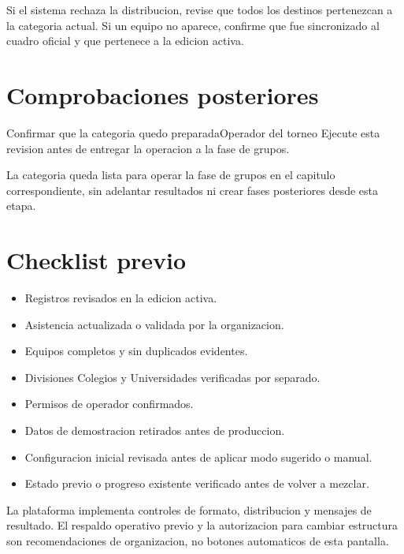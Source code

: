 \begin{fallas}
Si el sistema rechaza la distribucion, revise que todos los destinos pertenezcan a la categoria actual. Si un equipo no aparece, confirme que fue sincronizado al cuadro oficial y que pertenece a la edicion activa.
\end{fallas}

\section{Comprobaciones posteriores}

\begin{procedimiento}{Confirmar que la categoria quedo preparada}{Operador del torneo}
Ejecute esta revision antes de entregar la operacion a la fase de grupos.
\end{procedimiento}


\begin{resultadoesperado}
La categoria queda lista para operar la fase de grupos en el capitulo correspondiente, sin adelantar resultados ni crear fases posteriores desde esta etapa.
\end{resultadoesperado}

\section{Checklist previo}

\begin{itemize}
    \item Registros revisados en la edicion activa.
    \item Asistencia actualizada o validada por la organizacion.
    \item Equipos completos y sin duplicados evidentes.
    \item Divisiones Colegios y Universidades verificadas por separado.
    \item Permisos de operador confirmados.
    \item Datos de demostracion retirados antes de produccion.
    \item Configuracion inicial revisada antes de aplicar modo sugerido o manual.
    \item Estado previo o progreso existente verificado antes de volver a mezclar.
\end{itemize}

\begin{nota}
La plataforma implementa controles de formato, distribucion y mensajes de resultado. El respaldo operativo previo y la autorizacion para cambiar estructura son recomendaciones de organizacion, no botones automaticos de esta pantalla.
\end{nota}
